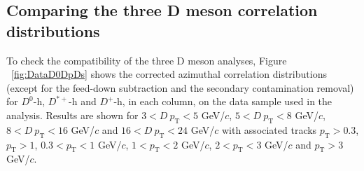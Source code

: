 \label{results}
\subsection{Comparing the three D meson correlation distributions}
To check the compatibility of the three D meson analyses, Figure ~\ref{fig:DataD0DpDs} shows the corrected azimuthal correlation distributions (except for the feed-down subtraction and the secondary contamination removal) for $D^0$-h, $D^{*+}$-h and $D^+$-h, in each column, on the data sample used in the analysis. Results are shown for $3 < D\ p_\text{T} < 5$ GeV/$c$, $5 < D\ p_\text{T} < 8$ GeV/$c$, $8 < D \ p_\text{T} < 16$ GeV/$c$ and $16 < D\ p_\text{T} < 24$ GeV/$c$ with associated tracks $p_\text{T} > 0.3$, $p_\text{T} > 1$, $0.3 < p_\text{T} < 1$ GeV/$c$, $1 < p_\text{T} < 2$ GeV/$c$, $2 < p_\text{T} < 3$ GeV/$c$ and $ p_\text{T} > 3$ GeV/$c$.

